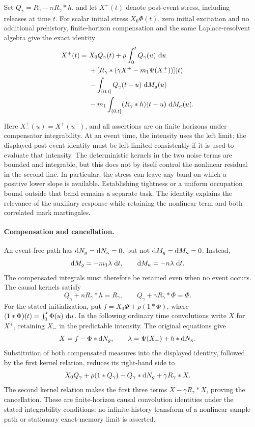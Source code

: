 \begin{samepage}
Set $Q_\gamma=R_\gamma-nR_\gamma*h$, and let $X^+(t)$ denote post-event stress, including releases at time $t$. For scalar initial stress \(X_0\Phi(t)\), zero initial excitation and no additional prehistory, finite-horizon compensation and the same Laplace-resolvent algebra give the exact identity
\begin{align}
X^+(t)={}&X_0Q_\gamma(t)+\rho\int_0^tQ_\gamma(u)\,\mathop{}\!\mathrm{d} u \notag\\
&+[R_\gamma*(\gamma X^+-m_1\Psi(X^+_-))](t) \notag\\
&-\int_{(0,t]}Q_\gamma(t-u)\,\mathop{}\!\mathrm{d} M_g(u) \notag\\
&-m_1\int_{(0,t]}(R_\gamma*h)(t-u)\,\mathop{}\!\mathrm{d} M_\kappa(u).
\label{eq:marked-resolvent}
\end{align}
\end{samepage}
Here $X^+_-(u)=X^+(u^-)$, and all assertions are on finite horizons under compensator integrability. At an event time, the intensity uses the left limit; the displayed post-event identity must be left-limited consistently if it is used to evaluate that intensity. The deterministic kernels in the two noise terms are bounded and integrable, but this does not by itself control the nonlinear residual in the second line. In particular, the stress can leave any band on which a positive lower slope is available. Establishing tightness or a uniform occupation bound outside that band remains a separate task. The identity explains the relevance of the auxiliary response while retaining the nonlinear term and both correlated mark martingales.

\paragraph{Compensation and cancellation.}
An event-free path has $\mathop{}\!\mathrm{d} N_g=\mathop{}\!\mathrm{d} N_\kappa=0$, but not
$\mathop{}\!\mathrm{d} M_g=\mathop{}\!\mathrm{d} M_\kappa=0$. Instead,
\[
  \mathop{}\!\mathrm{d} M_g=-m_1\lambda\,\mathop{}\!\mathrm{d} t,
  \qquad
  \mathop{}\!\mathrm{d} M_\kappa=-n\lambda\,\mathop{}\!\mathrm{d} t.
\]
The compensated integrals must therefore be retained even when no event
occurs. The causal kernels satisfy
\[
 Q_\gamma+nR_\gamma*h=R_\gamma,
 \qquad
 Q_\gamma+\gamma R_\gamma*\Phi=\Phi.
\]
For the stated initialization, put
$f=X_0\Phi+\rho(1*\Phi)$, where $(1*\Phi)(t)=\int_0^t\Phi(u)\,\mathop{}\!\mathrm{d} u$.
In the following ordinary time convolutions write $X$ for $X^+$, retaining
$X_-$ in the predictable intensity. The original equations give
\[
 X=f-\Phi*\mathop{}\!\mathrm{d} N_g,
 \qquad \lambda=\Psi(X_-)+h*\mathop{}\!\mathrm{d} N_\kappa.
\]
Substitution of both compensated measures into the displayed identity,
followed by the first kernel relation, reduces its right-hand side to
\[
 X_0Q_\gamma+\rho(1*Q_\gamma)-Q_\gamma*\mathop{}\!\mathrm{d} N_g
   +\gamma R_\gamma*X.
\]
The second kernel relation makes the first three terms
$X-\gamma R_\gamma*X$, proving the cancellation. These are finite-horizon
causal convolution identities under the stated integrability conditions;
no infinite-history transform of a nonlinear sample path or stationary
exact-memory limit is asserted.


